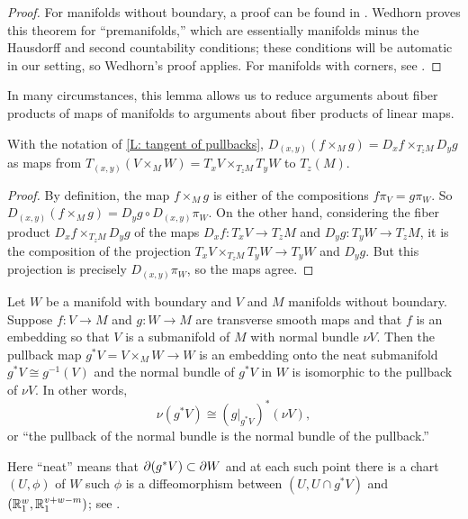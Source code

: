 \begin{proof}
For manifolds without boundary, a proof can be found in \cite[Theorem 5.47]{Wed16}.
Wedhorn proves this theorem for ``premanifolds,'' which are essentially manifolds minus the Hausdorff and second countability conditions; these conditions will be automatic in our setting, so Wedhorn's proof applies.
For manifolds with corners, see \cite[Proposition 7.2.7.c]{MaDo92}.
\end{proof}

In many circumstances, this lemma allows us to reduce arguments about fiber products of maps of manifolds to arguments about fiber products of linear maps.

\begin{corollary}\label{C: tangent map of pullbacks}
With the notation of \cref{L: tangent of pullbacks}, $D_{(x,y)}(f \times_M g)=D_xf \times_{T_zM} D_yg$ as maps from $T_{(x,y)}(V \times_M W) = T_xV \times_{T_zM} T_yW$ to $T_z(M)$.
\end{corollary}
\begin{proof}
By definition, the map $f \times_M g$ is either of the compositions $f \pi_V = g \pi_W$. So $D_{(x,y)} (f \times_M g) = D_yg \circ D_{(x,y)} \pi_W$. On the other hand, considering the fiber product $D_xf \times_{T_z M} D_y g$ of the maps $D_x f \colon T_xV \to T_zM$ and $D_y g \colon T_yW \to T_zM$, it is the composition of the projection $T_xV \times_{T_zM} T_yW \to  T_yW$ and $D_y g$. 
But this projection is precisely $D_{(x,y)} \pi_W$, so the maps agree.
\end{proof}


\begin{lemma}\label{L: normal pullback}
	Let $W$ be a manifold with boundary and $V$ and $M$ manifolds without boundary. Suppose $f \colon V \to M$ and $g \colon W \to M$ are transverse smooth maps and that $f$ is an embedding so that $V$ is a submanifold of $M$ with normal bundle $\nu V$.
	Then the pullback map $g^*V = V \times_MW \to W$ is an embedding onto the neat submanifold $g^*V \cong g^{-1}(V)$ and the normal bundle of $g^*V$ in $W$ is isomorphic to the pullback of $\nu V$.
	In other words,
	$$\nu(g^*V) \cong \left(g|_{g^*V}\right)^*(\nu V),$$
	or ``the pullback of the normal bundle is the normal bundle of the pullback.''
\end{lemma}

Here ``neat'' means that $\partial (g^*V) \subset \partial W$ and at each such point there is a chart $(U,\phi)$ of $W$ such $\phi$ is a diffeomorphism between $(U, U\cap g^*V)$ and $(\mathbb{R}^w_1, \mathbb{R}^{v+w-m}_1)$; see \cite[Definition II.2.2]{Kos93}.  

